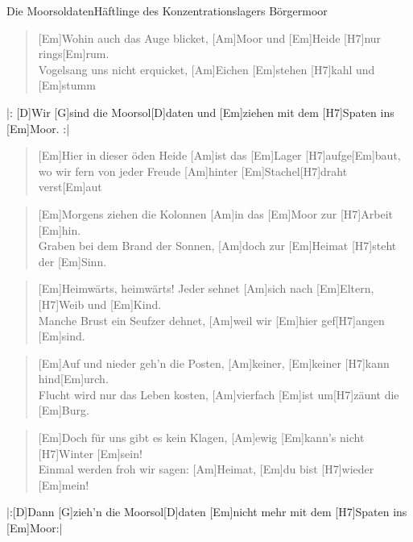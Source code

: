 \begin{song}{Die Moorsoldaten}{Häftlinge des Konzentrationslagers Börgermoor}

    \begin{verse}  
        [Em]Wohin auch das Auge blicket, [Am]Moor und [Em]Heide [H7]nur rings[Em]rum. \\
        [G]Vogelsang uns nicht erquicket, [Am]Eichen [Em]stehen [H7]kahl und [Em]stumm 
    \end{verse}  

    \begin{chorus}
        |: [D]Wir [G]sind die Moorsol[D]daten
        und [Em]ziehen mit dem [H7]Spaten ins [Em]Moor. :|
    \end{chorus}

    \begin{verse}  
        [Em]Hier in dieser öden Heide [Am]ist das [Em]Lager [H7]aufge[Em]baut, \\
        [G]wo wir fern von jeder Freude [Am]hinter [Em]Stachel[H7]draht verst[Em]aut
    \end{verse}  


    \begin{verse}  
        [Em]Morgens ziehen die Kolonnen [Am]in das [Em]Moor zur [H7]Arbeit [Em]hin. \\
        [G]Graben bei dem Brand der Sonnen, [Am]doch zur [Em]Heimat [H7]steht der [Em]Sinn.
    \end{verse}  


    \begin{verse}  
        [Em]Heimwärts, heimwärts! Jeder sehnet [Am]sich nach [Em]Eltern, [H7]Weib und [Em]Kind. \\
        [G]Manche Brust ein Seufzer dehnet, [Am]weil wir [Em]hier gef[H7]angen [Em]sind.
    \end{verse}  


    \begin{verse}  
        [Em]Auf und nieder geh'n die Posten, [Am]keiner, [Em]keiner [H7]kann hind[Em]urch. \\
        [G]Flucht wird nur das Leben kosten, [Am]vierfach [Em]ist um[H7]zäunt die [Em]Burg.
    \end{verse}  


    \begin{verse}  
        [Em]Doch für uns gibt es kein Klagen, [Am]ewig [Em]kann's nicht [H7]Winter [Em]sein! \\
        [G]Einmal werden froh wir sagen: [Am]Heimat, [Em]du bist [H7]wieder [Em]mein!
    \end{verse}  

    \begin{chorus}
        |:[D]Dann [G]zieh'n die Moorsol[D]daten [Em]nicht mehr mit dem [H7]Spaten ins [Em]Moor:|
    \end{chorus}

\end{song}
